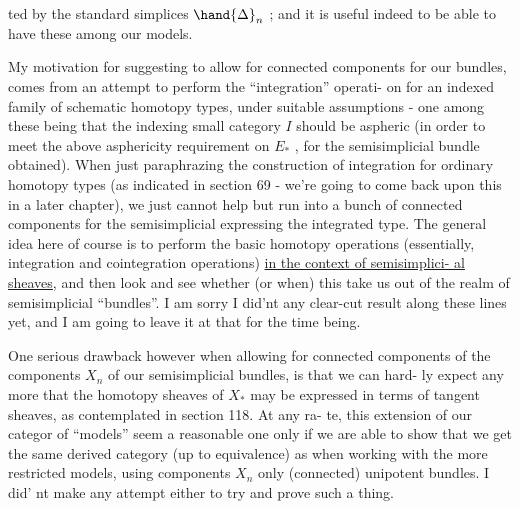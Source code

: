 
ted by the standard simplices $\hand{\Delta}_n$ ; and it is useful indeed to be able
to have these among our models.

My motivation for suggesting to allow for connected components for
our bundles, comes from an attempt to perform the ``integration'' operati-%
on for an indexed family of schematic homotopy types, under suitable
assumptions - one among these being that the indexing small category
$I$ should be aspheric (in order to meet the above asphericity requirement
on $E_*$ , for the semisimplicial bundle obtained). When just paraphrazing
the construction of integration for ordinary homotopy types (as indicated
in section 69 - we're going to come back upon this in a later chapter),
we just cannot help but run into a bunch of connected components\hand{,} for the 
semisimplicial   expressing the integrated type. The general idea
here of course is to perform the basic homotopy operations (essentially,
integration and cointegration operations) \uline{in the context of semisimplici-%
al sheaves}, and then look and see whether (or when) this  take us
out of the realm of semisimplicial ``bundles''. I am sorry I did'nt 
  any clear-cut result along these lines yet, and I am going to
leave it at that for the time being.

 One serious drawback however when allowing for connected components
of the components $X_n$ of our semisimplicial bundles, is that we can hard-%
ly expect any more that the homotopy sheaves of $X_*$ may be expressed 
in terms of tangent sheaves, as contemplated in section 118. At any ra-%
te, this extension of our categor of ``models''   seem a reasonable
one  only if we are able to show that we get the same derived
category (up to equivalence) as when working with the more restricted
models, using  components $X_n$ only (connected) unipotent bundles. I did'%
nt make any attempt either to try and prove such a thing.

